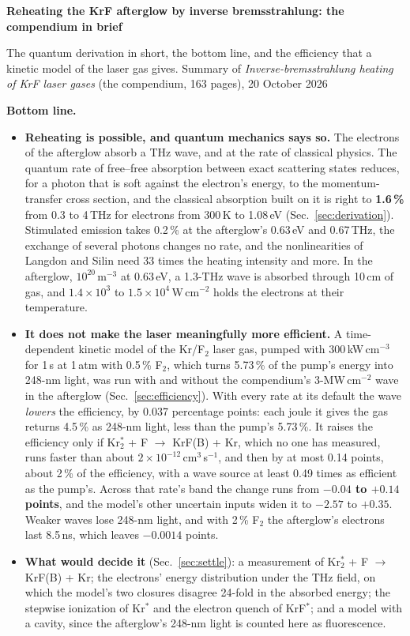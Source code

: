 \documentclass[11pt]{article}
\newcommand{\unc}[1]{\colorbox{hlbg}{\textbf{#1}}}
\newcommand{\Krs}{Kr\ensuremath{^*}}
\newcommand{\Krts}{Kr\ensuremath{_2^*}}
\newcommand{\Ft}{F\ensuremath{_2}}
\newcommand{\KrF}{KrF\ensuremath{^*}}
\begin{document}
{\LARGE\bfseries Reheating the KrF afterglow by inverse bremsstrahlung: the compendium in brief}\par
\vspace{4pt}
{\color{ink2} The quantum derivation in short, the bottom line, and the efficiency that a kinetic
model of the laser gas gives. Summary of \emph{Inverse-bremsstrahlung heating of KrF laser gases}
(the compendium, 163 pages), 20 October 2026}
\vspace{6pt}

\textbf{Bottom line.}
\begin{itemize}
\item \textbf{Reheating is possible, and quantum mechanics says so.} The electrons of the
  afterglow absorb a THz wave, and at the rate of classical physics. The quantum rate of
  free--free absorption between exact scattering states reduces, for a photon that is soft
  against the electron's energy, to the momentum-transfer cross section, and the classical
  absorption built on it is right to \unc{1.6\,\%} from 0.3 to 4\,THz for electrons from 300\,K
  to 1.08\,eV (Sec.~\ref{sec:derivation}). Stimulated emission takes 0.2\,\% at the afterglow's
  0.63\,eV and 0.67\,THz, the exchange of several photons changes no rate, and the
  nonlinearities of Langdon and Silin need 33 times the heating intensity and more. In the
  afterglow, $10^{20}$\,m$^{-3}$ at 0.63\,eV, a 1.3-THz wave is absorbed through 10\,cm of gas,
  and $1.4\times10^{3}$ to $1.5\times10^{4}$\,W\,cm$^{-2}$ holds the electrons at their
  temperature.
\item \textbf{It does not make the laser meaningfully more efficient.} A time-dependent kinetic
  model of the Kr/\Ft{} laser gas, pumped with 300\,kW\,cm$^{-3}$ for 1\,\textmu s at 1\,atm with
  0.5\,\% \Ft{}, which turns 5.73\,\% of the pump's energy into 248-nm light, was run with and
  without the compendium's 3-MW\,cm$^{-2}$ wave in the afterglow (Sec.~\ref{sec:efficiency}).
  With every rate at its default the wave \emph{lowers} the efficiency, by 0.037 percentage
  points: each joule it gives the gas returns 4.5\,\% as 248-nm light, less than the pump's
  5.73\,\%. It raises the efficiency only if \Krts{} + F $\to$ KrF(B) + Kr, which no one has
  measured, runs faster than about $2\times10^{-12}$\,cm$^3$\,s$^{-1}$, and then by at most
  0.14 points, about 2\,\% of the efficiency, with a wave source at least 0.49 times as
  efficient as the pump's. Across that rate's band the change runs from
  \unc{$-0.04$ to $+0.14$ points}, and the model's other uncertain inputs widen it to $-2.57$ to
  $+0.35$. Weaker waves lose 248-nm light, and with 2\,\% \Ft{} the afterglow's electrons last
  8.5\,ns, which leaves $-0.0014$ points.
\item \textbf{What would decide it} (Sec.~\ref{sec:settle}): a measurement of
  \Krts{} + F $\to$ KrF(B) + Kr; the electrons' energy distribution under the THz field, on which
  the model's two closures disagree 24-fold in the absorbed energy; the stepwise ionization of
  \Krs{} and the electron quench of \KrF{}; and a model with a cavity, since the afterglow's
  248-nm light is counted here as fluorescence.
\end{itemize}
\end{document}
